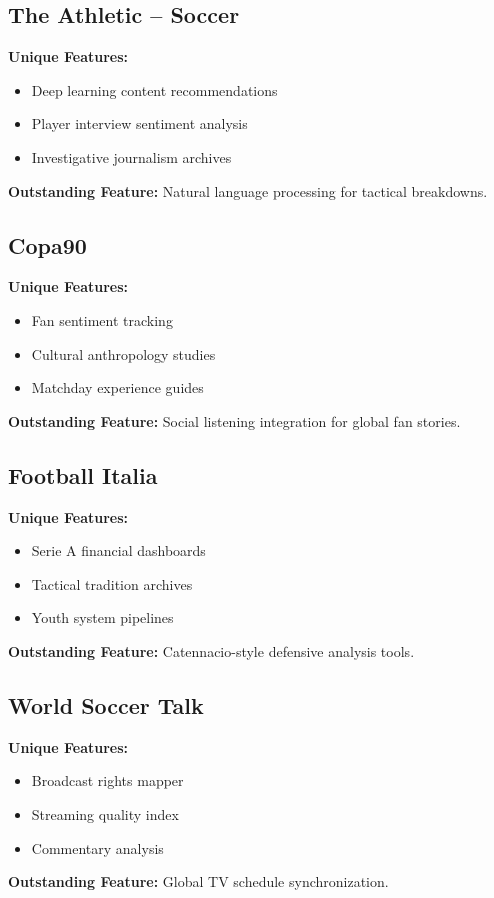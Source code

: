 \subsection{The Athletic – Soccer}
\textbf{Unique Features:}
\begin{itemize}
    \item Deep learning content recommendations
    \item Player interview sentiment analysis
    \item Investigative journalism archives
\end{itemize}
\textbf{Outstanding Feature:} Natural language processing for tactical breakdowns\parencite{athletic}.

\subsection{Copa90}
\textbf{Unique Features:}
\begin{itemize}
    \item Fan sentiment tracking
    \item Cultural anthropology studies
    \item Matchday experience guides
\end{itemize}
\textbf{Outstanding Feature:} Social listening integration for global fan stories\parencite{copa90}.

\subsection{Football Italia}
\textbf{Unique Features:}
\begin{itemize}
    \item Serie A financial dashboards
    \item Tactical tradition archives
    \item Youth system pipelines
\end{itemize}
\textbf{Outstanding Feature:} Catennacio-style defensive analysis tools\parencite{footballitalia}.

\subsection{World Soccer Talk}
\textbf{Unique Features:}
\begin{itemize}
    \item Broadcast rights mapper
    \item Streaming quality index
    \item Commentary analysis
\end{itemize}
\textbf{Outstanding Feature:} Global TV schedule synchronization\parencite{worldsoccertalk}.

